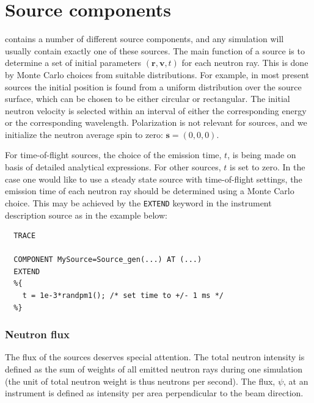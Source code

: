 
\chapter{Source components}
\label{c:source}

\MCS contains a number of different source components,
and any simulation will usually contain exactly one of these sources.
The main function of a source is to determine a set of initial
parameters $(\textbf{r}, \textbf{v}, t)$
for each neutron ray. This is done by Monte Carlo choices from
suitable distributions. For example, in most present sources
the initial position is
found from a uniform distribution over the source surface,
which can be chosen to be either circular or rectangular.
The initial neutron velocity is selected within an interval
of either the corresponding energy or the corresponding wavelength.
Polarization is not relevant for sources,
and we initialize the neutron average spin to zero: $\textbf{s}=(0,0,0)$.

For time-of-flight sources, the choice of the emission time, $t$,
is being made on basis of detailed analytical expressions.
For other sources, $t$ is set to zero.
In the case one would like to use a steady state source
with time-of-flight settings,
the emission time of each neutron ray should be determined using
a Monte Carlo choice. This may be achieved by
the \verb+EXTEND+ keyword in the instrument description source
as in the example below:

\begin{lstlisting}
  TRACE

  COMPONENT MySource=Source_gen(...) AT (...)
  EXTEND
  %{
    t = 1e-3*randpm1(); /* set time to +/- 1 ms */
  %}
\end{lstlisting}

\subsection{Neutron flux}
\label{s:neutron-flux}
The flux of the sources deserves special attention. The total neutron
intensity is defined as the sum of weights of all emitted neutron rays
during one simulation
(the unit of total neutron weight is thus neutrons per second).
The flux, $\psi$, at an instrument is defined as intensity per area perpendicular
to the beam direction.

